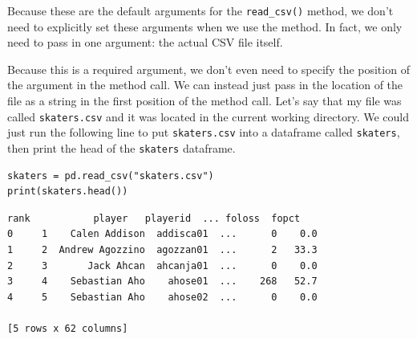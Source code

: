 Because these are the default arguments for the \verb|read_csv()| method, we don't need to explicitly set these arguments when we use the method. In fact, we only need to pass in one argument: the actual CSV file itself.\par
Because this is a required argument, we don't even need to specify the position of the argument in the method call. We can instead just pass in the location of the file as a string in the first position of the method call. Let's say that my file was called \verb|skaters.csv| and it was located in the current working directory. We could just run the following line to put \verb|skaters.csv| into a dataframe called \verb|skaters|, then print the head of the \verb|skaters| dataframe.\par
\begin{lstlisting}[style=pippython]
skaters = pd.read_csv("skaters.csv")
print(skaters.head())
\end{lstlisting}
\begin{lstlisting}[style=none]
   rank           player   playerid  ... foloss  fopct
0     1    Calen Addison  addisca01  ...      0    0.0
1     2  Andrew Agozzino  agozzan01  ...      2   33.3
2     3       Jack Ahcan  ahcanja01  ...      0    0.0
3     4    Sebastian Aho    ahose01  ...    268   52.7
4     5    Sebastian Aho    ahose02  ...      0    0.0

[5 rows x 62 columns]
\end{lstlisting}
